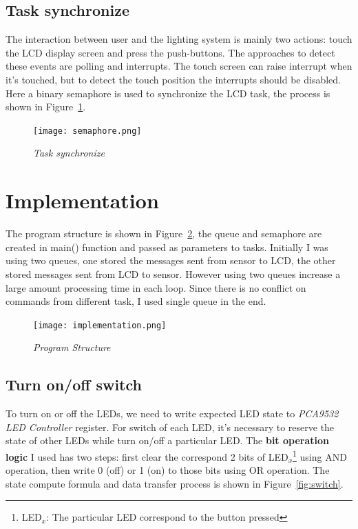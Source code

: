 \subsection{Task synchronize}
The interaction between user and the lighting system is mainly two actions: touch the LCD display screen and press the push-buttons. The approaches to detect these events are polling and interrupts. The touch screen can raise interrupt when it's touched, but to detect the touch position the interrupts should be disabled. Here a binary semaphore is used to synchronize the LCD task, the process is shown in Figure~\ref{fig:semaphore}.

\begin{figure}[H]
\centering
\texttt{[image: semaphore.png]}
\caption{\label{fig:semaphore}\textit{Task synchronize}}
\end{figure}

\section{Implementation}
The program structure is shown in Figure~\ref{fig:implementation}, the queue and semaphore are created in main() function and passed as parameters to tasks. Initially I was using two queues, one stored the messages sent from sensor to LCD, the other stored messages sent from LCD to sensor. However using two queues increase a large amount processing time in each loop. Since there is no conflict on commands from different task, I used single queue in the end.

\begin{figure}[H]
\centering
\texttt{[image: implementation.png]}
\caption{\label{fig:implementation}\textit{Program Structure}}
\end{figure}

\subsection{Turn on/off switch}
To turn on or off the LEDs, we need to write expected LED state to \textit{PCA9532 LED Controller} register. For switch of each LED, it's necessary to reserve the state of other LEDs while turn on/off a particular LED. The \textbf{bit operation logic} I used has two steps: first clear the correspond 2 bits of LED$_x$\footnote{LED$_x$: The particular LED correspond to the button pressed} using AND operation, then write 0 (off) or 1 (on) to those bits using OR operation. The state compute formula and data transfer process is shown in Figure~\ref{fig:switch}.


